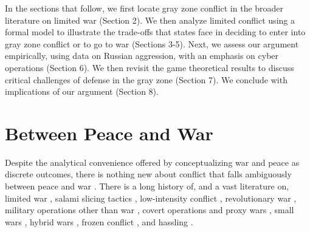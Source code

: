 \documentclass[bibtex, autowc]{apsr_submission}
\begin{document}
In the sections that follow, we first locate gray zone conflict in the broader literature on limited war (Section 2). We then analyze limited conflict using a formal model to illustrate the trade-offs that states face in deciding to enter into gray zone conflict or to go to war (Sections 3-5). Next, we assess our argument empirically, using data on Russian aggression, with an emphasis on cyber operations (Section 6). We then revisit the game theoretical results to discuss critical challenges of defense in the gray zone (Section 7). We conclude with implications of our argument (Section 8).

\section{Between Peace and War}
Despite the analytical convenience offered by conceptualizing war and peace as discrete outcomes, there is nothing new about conflict that falls ambiguously between peace and war \citep{lebow_futurewar_2010}. There is a long history of, and a vast literature on, limited war \citep{kissinger_militarypolicydefense_1955, osgood_reappraisallimitedwar_1969}, salami slicing tactics \citep{schelling_armsinfluence_1966}, low-intensity conflict \citep{turbiville_prefacefuturetrends_2002}, revolutionary war \citep{shy_revolutionarywar_1986}, military operations other than war \citep{kinross_clausewitzlowintensityconflict_2004}, covert operations and proxy wars \citep{carson_secretwarscovert_2018, orourke_covertregimechange_2018}, small wars \citep{olson_conceptsmallwars_1990}, hybrid wars \citep{lanoszka_russianhybridwarfare_2016}, frozen conflict \citep{driscoll_friendsthesebrinkmanship_2016}, and hassling \citep{schram_hasslinghowstates_2020}.
\end{document}
